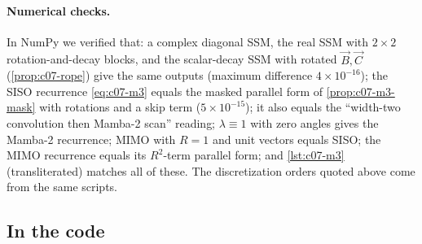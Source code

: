 \paragraph{Numerical checks.} In NumPy we verified that: a complex diagonal SSM, the real SSM
with $2\times2$ rotation-and-decay blocks, and the scalar-decay SSM with rotated $\vec B,\vec C$
(\cref{prop:c07-rope}) give the same outputs (maximum difference $4\times10^{-16}$); the SISO
recurrence \cref{eq:c07-m3} equals the masked parallel form of \cref{prop:c07-m3-mask} with
rotations and a skip term ($5\times10^{-15}$); it also equals the ``width-two convolution then
Mamba-2 scan'' reading; $\lambda\equiv1$ with zero angles gives the Mamba-2 recurrence; MIMO with
$R=1$ and unit vectors equals SISO; the MIMO recurrence equals its $R^2$-term parallel form;
and \cref{lst:c07-m3} (transliterated) matches all of these. The discretization orders quoted
above come from the same scripts.

\subsection{In the code}\label{sec:c07-m3-code}

